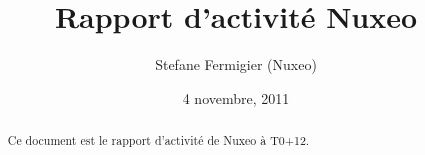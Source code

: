 \documentclass[a4paper,11pt]{article}
\title{Rapport d'activité Nuxeo}
\date{4 novembre, 2011}
\author{Stefane Fermigier (Nuxeo)}
\begin{document}
\maketitle
\begin{abstract}
  Ce document est le rapport d'activité de Nuxeo à T0+12.
\end{abstract}

\tableofcontents

\pagebreak


\end{document}
